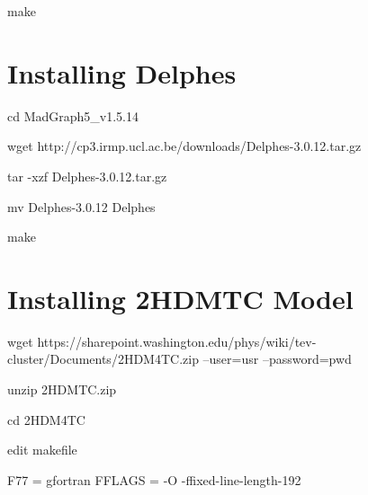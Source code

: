 \documentclass{article}
\begin{document}
make

\section {Installing Delphes}

cd MadGraph5\_v1.5.14

wget http://cp3.irmp.ucl.ac.be/downloads/Delphes-3.0.12.tar.gz

tar -xzf Delphes-3.0.12.tar.gz

mv Delphes-3.0.12 Delphes

make

\section {Installing 2HDMTC Model}

wget https://sharepoint.washington.edu/phys/wiki/tev-cluster/Documents/2HDM4TC.zip --user=usr --password=pwd

unzip 2HDMTC.zip

cd 2HDM4TC

edit makefile

F77 = gfortran
FFLAGS = -O -ffixed-line-length-192
\end{document}
